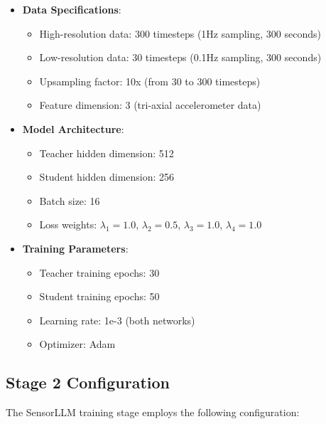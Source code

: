\begin{itemize}
    \item \textbf{Data Specifications}: 
    \begin{itemize}
        \item High-resolution data: 300 timesteps (1Hz sampling, 300 seconds)
        \item Low-resolution data: 30 timesteps (0.1Hz sampling, 300 seconds) 
        \item Upsampling factor: 10x (from 30 to 300 timesteps)
        \item Feature dimension: 3 (tri-axial accelerometer data)
    \end{itemize}
    \item \textbf{Model Architecture}:
    \begin{itemize}
        \item Teacher hidden dimension: 512
        \item Student hidden dimension: 256
        \item Batch size: 16
        \item Loss weights: $\lambda_1=1.0$, $\lambda_2=0.5$, $\lambda_3=1.0$, $\lambda_4=1.0$
    \end{itemize}
    \item \textbf{Training Parameters}:
    \begin{itemize}
        \item Teacher training epochs: 30
        \item Student training epochs: 50
        \item Learning rate: 1e-3 (both networks)
        \item Optimizer: Adam
    \end{itemize}
\end{itemize}

\subsection{Stage 2 Configuration}

\hspace{2em}The SensorLLM training stage employs the following configuration:

